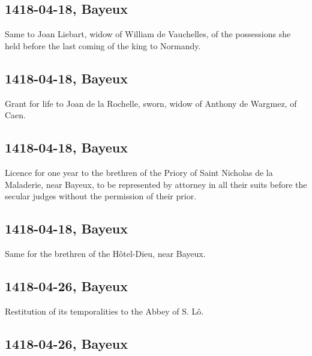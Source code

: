 \documentclass[a4paper,12pt,twoside]{book}
\begin{document}
                
                \subsection{1418-04-18, Bayeux}
                
                
                     Same to Joan Liebart, widow of William de Vauchelles, of the possessions she held before the last coming of the king to Normandy.
                  
                
                \subsection{1418-04-18, Bayeux}
                
                
                     Grant for life to Joan de la Rochelle, sworn, widow of Anthony de Wargmez, of Caen.
                  
                
                \subsection{1418-04-18, Bayeux}
                
                
                     Licence for one year to the brethren of the Priory of Saint Nicholas de la Maladerie, near Bayeux, to be represented by attorney in all their suits before the secular judges without the permission of their prior.
                  
                
                \subsection{1418-04-18, Bayeux}
                
                
                     Same for the brethren of the Hôtel-Dieu, near Bayeux.
                  
                
                \subsection{1418-04-26, Bayeux}
                
                
                     Restitution of its temporalities to the Abbey of S. Lô.
                  
                
                \subsection{1418-04-26, Bayeux}
                
\end{document}

